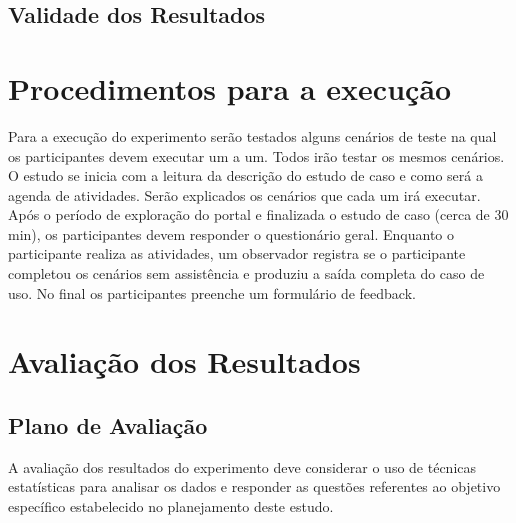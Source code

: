 \subsection{Validade dos Resultados}


\section{Procedimentos para a execução}

Para a execução do experimento serão testados alguns cenários de teste na qual os participantes devem executar um a um. Todos irão testar os mesmos cenários.
O estudo se inicia com a leitura da descrição do estudo de caso e como será a agenda de atividades. Serão explicados os cenários que cada um irá executar.
Após o período de exploração do portal e finalizada o estudo de caso (cerca de 30 min), os participantes devem responder o questionário geral.
Enquanto o participante realiza as atividades, um observador registra se o participante completou os cenários sem assistência e produziu a saída completa do caso de uso.
No final os participantes preenche um formulário de feedback.

\section{Avaliação dos Resultados}

\subsection{Plano de Avaliação}


A avaliação dos resultados do experimento deve considerar o uso de técnicas estatísticas para analisar os dados e responder as questões referentes ao objetivo específico estabelecido no planejamento deste estudo.





